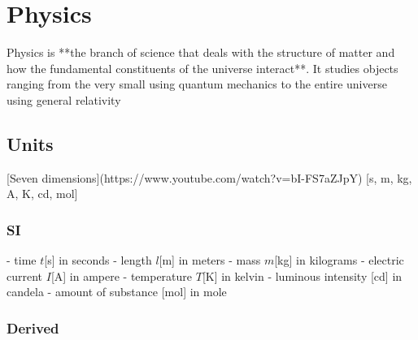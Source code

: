 \section{Physics}

Physics is **the branch of science that deals with the structure of matter and how the fundamental constituents of the universe interact**. It studies objects ranging from the very small using quantum mechanics to the entire universe using general relativity
\subsection{Units}

[Seven dimensions](https://www.youtube.com/watch?v=bI-FS7aZJpY) [s, m, kg, A, K, cd, mol]

\subsubsection{SI}

- time $t$[s] in seconds
- length $l$[m] in meters
- mass $m$[kg] in kilograms
- electric current $I$[A] in ampere
- temperature $T$[K] in kelvin
- luminous intensity [cd] in candela
- amount of substance [mol] in mole

\subsubsection{Derived}

\newcommand{\llist}[7]{&\text{[#1}&&\,&\text{#2}&\,&\text{#3}&\,&\text{#4}&\,&\text{#5}&\,&\text{#6}&\,&\text{#7}&\text{]}}
\newcommand{\unit}[4]{\\\text{#1:} \kern 1em & #2 &=& & #3 &\implies & #4 \\\,}
\newcommand{\aproxor}[2]{\text{#1:} \kern 1em &  &\approx& & #2   \\\,}
\newcommand{\pow}[2]{\text{#1}^\text{#2}}
\renewcommand{\in}[1]{\left[#1\right]}

